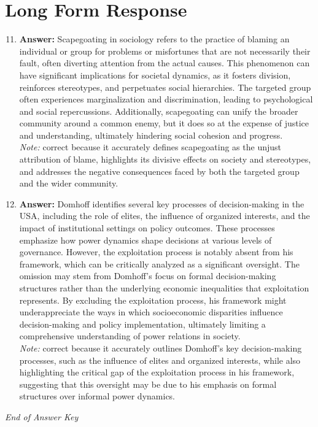 \documentclass[12pt]{article}
\begin{document}
\section*{Long Form Response}
\begin{enumerate}[label=\arabic*.]
\setcounter{enumi}{10}
\item \textbf{Answer:} Scapegoating in sociology refers to the practice of blaming an individual or group for problems or misfortunes that are not necessarily their fault, often diverting attention from the actual causes. This phenomenon can have significant implications for societal dynamics, as it fosters division, reinforces stereotypes, and perpetuates social hierarchies. The targeted group often experiences marginalization and discrimination, leading to psychological and social repercussions. Additionally, scapegoating can unify the broader community around a common enemy, but it does so at the expense of justice and understanding, ultimately hindering social cohesion and progress.
\\ \textit{Note:} correct because it accurately defines scapegoating as the unjust attribution of blame, highlights its divisive effects on society and stereotypes, and addresses the negative consequences faced by both the targeted group and the wider community.
\item \textbf{Answer:} Domhoff identifies several key processes of decision-making in the USA, including the role of elites, the influence of organized interests, and the impact of institutional settings on policy outcomes. These processes emphasize how power dynamics shape decisions at various levels of governance. However, the exploitation process is notably absent from his framework, which can be critically analyzed as a significant oversight. The omission may stem from Domhoff's focus on formal decision-making structures rather than the underlying economic inequalities that exploitation represents. By excluding the exploitation process, his framework might underappreciate the ways in which socioeconomic disparities influence decision-making and policy implementation, ultimately limiting a comprehensive understanding of power relations in society.
\\ \textit{Note:} correct because it accurately outlines Domhoff's key decision-making processes, such as the influence of elites and organized interests, while also highlighting the critical gap of the exploitation process in his framework, suggesting that this oversight may be due to his emphasis on formal structures over informal power dynamics.
\end{enumerate}

\vfill
\noindent\textit{End of Answer Key}
\end{document}
